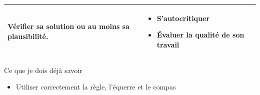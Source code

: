 \begin{tabularx}{\textwidth}{|>{\raggedright\arraybackslash}X|>{\raggedright\arraybackslash}X|}
Vérifier sa solution ou au moins sa plausibilité.
&\vspace{-1em}
\begin{itemize}[leftmargin=*, itemsep=2pt, topsep=0pt, label=$\triangleright$]
    \item S'autocritiquer
    \item Évaluer la qualité de son travail
\end{itemize} \\
\hline
\end{tabularx}
\def\arraystretch{1}


\vfill
\begin{astuce}{Ce que je dois déjà savoir}
\begin{itemize}[leftmargin=*, itemsep=2pt, topsep=2pt, label=$\triangleright$]
    \item Utiliser correctement la règle, l'équerre et le compas
\end{itemize}
\end{astuce}


